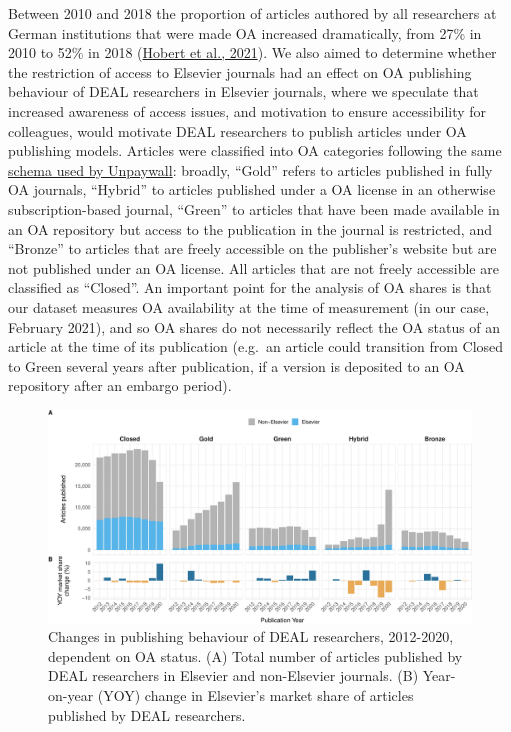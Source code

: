 \documentclass[
]{article}
\begin{document}
Between 2010 and 2018 the proportion of articles authored by all researchers at German institutions that were made OA increased dramatically, from 27\% in 2010 to 52\% in 2018 (\href{https://doi.org/10.1007/s11192-021-04002-0}{Hobert et al., 2021}). We also aimed to determine whether the restriction of access to Elsevier journals had an effect on OA publishing behaviour of DEAL researchers in Elsevier journals, where we speculate that increased awareness of access issues, and motivation to ensure accessibility for colleagues, would motivate DEAL researchers to publish articles under OA publishing models. Articles were classified into OA categories following the same \href{https://support.unpaywall.org/support/solutions/articles/44001777288-what-do-the-types-of-oa-status-green-gold-hybrid-and-bronze-mean-}{schema used by Unpaywall}: broadly, ``Gold'' refers to articles published in fully OA journals, ``Hybrid'' to articles published under a OA license in an otherwise subscription-based journal, ``Green'' to articles that have been made available in an OA repository but access to the publication in the journal is restricted, and ``Bronze'' to articles that are freely accessible on the publisher's website but are not published under an OA license. All articles that are not freely accessible are classified as ``Closed''. An important point for the analysis of OA shares is that our dataset measures OA availability at the time of measurement (in our case, February 2021), and so OA shares do not necessarily reflect the OA status of an article at the time of its publication (e.g.~an article could transition from Closed to Green several years after publication, if a version is deposited to an OA repository after an embargo period).

\begin{figure}

{\centering \includegraphics{analysis_files/figure-latex/items-publisher-year-oa-1} 

}

\caption{Changes in publishing behaviour of DEAL researchers, 2012-2020, dependent on OA status. (A) Total number of articles published by DEAL researchers in Elsevier and non-Elsevier journals. (B) Year-on-year (YOY) change in Elsevier's market share of articles published by DEAL researchers.}\label{fig:items-publisher-year-oa}
\end{figure}
\end{document}
